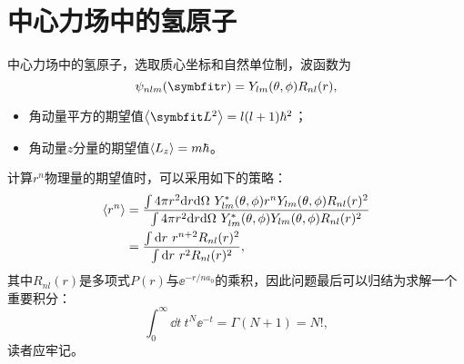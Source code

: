 \section{中心力场中的氢原子}

中心力场中的氢原子，选取质心坐标和自然单位制，波函数为
\begin{equation}
    \psi_{nlm}(\rr) = Y_{lm}(\theta,\phi) R_{nl}(r),
\end{equation}

\begin{itemize}
    \item 角动量平方的期望值$\expval{\LL^2}=l(l+1)\hbar^2$；
    \item 角动量$z$分量的期望值$\expval{L_z}=m\hbar$。
\end{itemize}

计算$r^n$物理量的期望值时，可以采用如下的策略：
\begin{equation}
\begin{aligned}
    \expval{r^n}
    &= \frac{\int 4\pi r^2 \dd r \dd\Omega \ Y_{lm}^*(\theta,\phi) r^n Y_{lm}(\theta,\phi) R_{nl}(r)^2}{\int4\pi r^2 \dd r \dd\Omega \ Y_{lm}^*(\theta,\phi) Y_{lm}(\theta,\phi) R_{nl}(r)^2} \\
    &= \frac{\int\dd r \ r^{n+2} R_{nl}(r)^2}{\int\dd r \ r^2 R_{nl}(r)^2},
\end{aligned}
\end{equation}
其中$R_{nl}(r)$是多项式$P(r)$与$\ee^{-r/na_0}$的乘积，因此问题最后可以归结为求解一个重要积分：
\begin{equation}
    \int_0^\infty \dd t \ t^{N} \ee^{-t} = \Gamma(N+1) = N!,
\end{equation}
读者应牢记。
